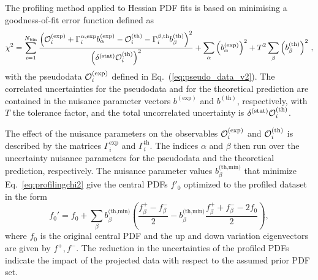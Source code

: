 The profiling method applied to Hessian PDF fits is based
on minimising a goodness-of-fit error function defined as
\begin{equation}
\chi^2 = 
\sum_{i=1}^{N_{\textrm{bin}}} 
{{\left(  \mathcal{O}_i^{\rm (exp)}
            + \Gamma_i^{\alpha,\textrm{exp}}
              b_\alpha^{\textrm{(exp)}}
            - \mathcal{O}_i^{\rm (th)}
            - \Gamma_i^{\beta,\textrm{th}}
              b_\beta^{(\textrm{th})}
     \right)^2
     }\over { \left(\delta^{{\rm (stat)}}\mathcal{O}_i^{\rm (th)}\right)^2 }}
+ \sum_\alpha \left( b_\alpha^{(\textrm{exp})}\right)^2
+ T^2 \sum_\beta  \left( b_\beta^{\textrm{(th)}}\right) ^2 \, ,
\label{eq:profilingchi2}
\end{equation}
with the pseudodata 
$\mathcal{O}_i^{\rm (exp)}$ defined in  Eq.~(\ref{eq:pseudo_data_v2}).
%
The correlated uncertainties for the pseudodata and for the theoretical prediction 
are contained in the nuisance parameter vectors $b^{(\textrm{exp})}$ and $b^{(\textrm{th})}$, respectively, with $T$ the tolerance factor, and the total uncorrelated uncertainty is $\delta^{{\rm (stat)}}\mathcal{O}_i^{\rm (th)}$.

The effect of the nuisance parameters
on the observables $\mathcal{O}_i^{\rm (exp)}$ and $\mathcal{O}_i^{\rm (th)}$
is described by the matrices $\Gamma_i^{\textrm{exp}}$ and $\Gamma_i^{\textrm{th}}$.
%
The indices $\alpha$ and $\beta$ then run over the uncertainty nuisance parameters for the pseudodata and the theoretical prediction, respectively.
%
The nuisance parameter values $b_\beta^{\textrm{(th,min)}}$ that minimize Eq.~\eqref{eq:profilingchi2} give the central PDFs $f'_0$ optimized to the profiled dataset in the form
\begin{equation}
f_0' = f_0
      + \sum_\beta b_\beta^{\textrm{(th,min)}} 
        \left(  \frac{f_\beta^+   -  f_\beta^- }{2}
              -    b_\beta^{\textrm{(th,min)}}
                \frac{f_\beta^+ + f_\beta^- - 2f_0}{2}
        \right),
\end{equation}
where $f_0$ is the original central PDF and the up and down variation eigenvectors are given by $f^+, f^-$.
%
The reduction in the uncertainties of the profiled PDFs indicate the impact
of the projected data with respect to the assumed prior PDF set.


